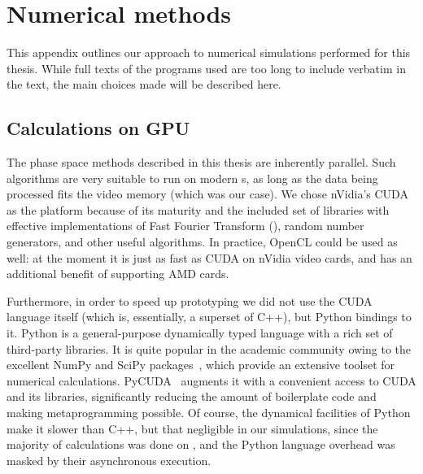 \chapter{Numerical methods}
\label{cha:appendix:numerical}

This appendix outlines our approach to numerical simulations performed for this thesis.
While full texts of the programs used are too long to include verbatim in the text, the main choices made will be described here.


\section{Calculations on GPU}

The phase space methods described in this thesis are inherently parallel.
Such algorithms are very suitable to run on modern s, as long as the data being processed fits the video memory (which was our case).
We chose nVidia's CUDA as the  platform because of its maturity and the included set of libraries with effective implementations of Fast Fourier Transform (), random number generators, and other useful algorithms.
In practice, OpenCL could be used as well: at the moment it is just as fast as CUDA on nVidia video cards, and has an additional benefit of supporting AMD cards.

Furthermore, in order to speed up prototyping we did not use the CUDA language itself (which is, essentially, a superset of C++), but Python bindings to it.
Python is a general-purpose dynamically typed language with a rich set of third-party libraries.
It is quite popular in the academic community owing to the excellent NumPy and SciPy packages~\cite{Oliphant2007}, which provide an extensive toolset for numerical calculations.
PyCUDA~\cite{Klockner2012} augments it with a convenient access to CUDA and its libraries, significantly reducing the amount of boilerplate code and making metaprogramming possible.
Of course, the dynamical facilities of Python make it slower than C++, but that negligible in our simulations, since the majority of calculations was done on , and the Python language overhead was masked by their asynchronous execution.

